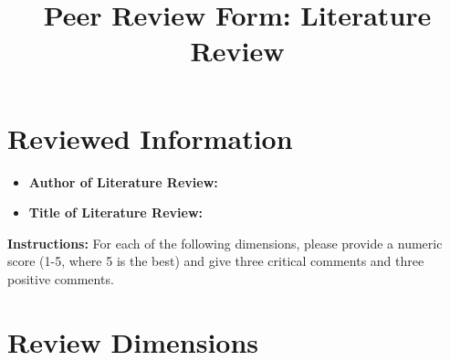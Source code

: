 \documentclass[12pt]{article}
\title{Peer Review Form: Literature Review}
\date{}
\begin{document}
\maketitle

\section*{Reviewed Information}
\begin{itemize}
    \item \textbf{Author of Literature Review:} \underline{\hspace{8cm}}
    \item \textbf{Title of Literature Review:} \underline{\hspace{8cm}}
\end{itemize}

\vspace{0.5cm}

\noindent \textbf{Instructions:} For each of the following dimensions, please provide a numeric score (1-5, where 5 is the best) and give three critical comments and three positive comments.

\vspace{0.5cm}

\section*{Review Dimensions}
\end{document}
